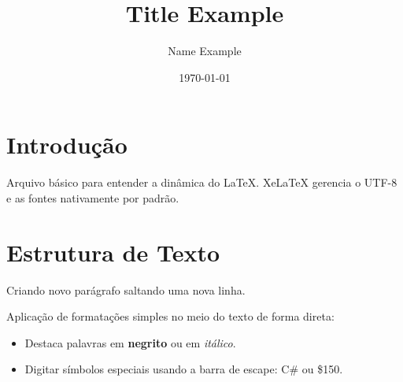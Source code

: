 \documentclass[12pt, a4paper]{article}
\title{Title Example}
\author{Name Example}
\date{\today}
\begin{document}
\maketitle %

\section{Introdução}
Arquivo básico para entender a dinâmica do LaTeX. XeLaTeX gerencia o UTF-8 e as fontes nativamente por padrão.

\section{Estrutura de Texto}
Criando novo parágrafo saltando uma nova linha.

Aplicação de formatações simples no meio do texto de forma direta:
\begin{itemize}
    \item Destaca palavras em \textbf{negrito} ou em \textit{itálico}.
    \item Digitar símbolos especiais usando a barra de escape: C\# ou \$150.
\end{itemize}
\end{document}

